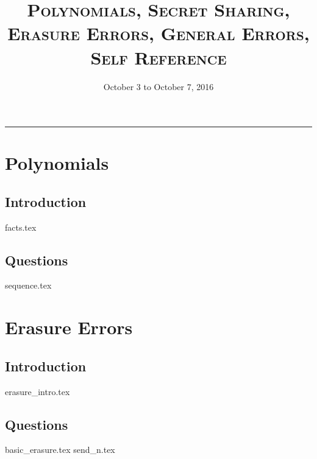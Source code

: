 \documentclass{exam}
\title{\textsc{Polynomials, Secret Sharing, Erasure Errors, General 
Errors, Self Reference }}
\date{October 3 to October 7, 2016}
\begin{document}
\maketitle
\rule{\textwidth}{0.15em}
\fontsize{12}{15}\selectfont
\thispagestyle{empty}

\section{Polynomials}
\subsection{Introduction}
{facts.tex}
\subsection{Questions}
\begin{questions}
{sequence.tex}
\end{questions}

\section{Erasure Errors}
\subsection{Introduction}
{erasure_intro.tex}
\subsection{Questions}
\begin{questions}
{basic_erasure.tex}
{send_n.tex}
\end{questions}

\end{document}

